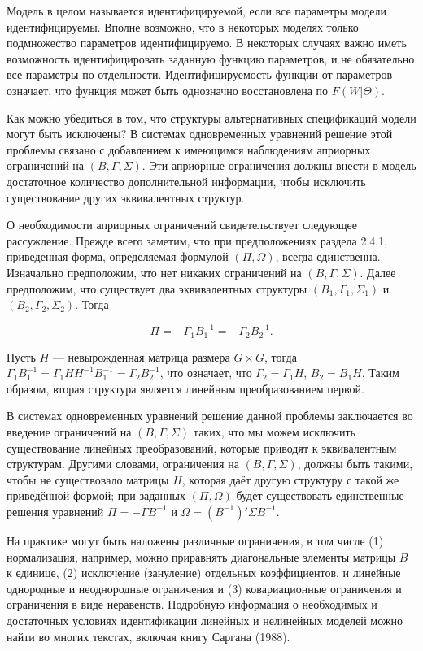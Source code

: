 Модель в целом называется идентифицируемой,  если все параметры модели идентифицируемы. Вполне возможно, что в некоторых моделях только подмножество параметров идентифицируемо. В некоторых случаях важно иметь возможность идентифицировать заданную функцию параметров, и не обязательно все  параметры по отдельности. Идентифицируемость функции от параметров означает, что функция может быть однозначно восстановлена по $F(W|\Theta)$.


Как можно убедиться в том, что структуры альтернативных спецификаций модели могут быть исключены? В системах одновременных уравнений решение этой проблемы связано с добавлением к имеющимся наблюдениям априорных ограничений на $(B,\Gamma,\Sigma)$. Эти априорные ограничения должны внести в модель достаточное количество дополнительной информации, чтобы исключить существование других эквивалентных структур.
	
	
О необходимости априорных ограничений свидетельствует следующее рассуждение. Прежде всего заметим, что при предположениях раздела 2.4.1, приведенная форма, определяемая формулой $(\Pi,\Omega)$, всегда единственна. Изначально предположим, что нет никаких ограничений на $(B,\Gamma,\Sigma)$. Далее предположим, что существует два эквивалентных структуры $(B_{1},\Gamma_{1},\Sigma_{1})$ и $(B_{2},\Gamma_{2},\Sigma_{2})$. Тогда
	
\begin{equation}
\Pi=-\Gamma_{1} B^{-1}_{1}=-\Gamma_{2} B^{-1}_{2}.
\end{equation}


Пусть $H$ --- невырожденная  матрица размера $G \times G$, тогда
$\Gamma_{1} B^{-1}_{1}=\Gamma_{1} H H^{-1} B^{-1}_{1}=\Gamma_{2} B^{-1}_{2}$, что означает, что $\Gamma_{2}=\Gamma_{1}H$, $B_{2}=B_{1}H$. Таким образом, вторая структура является линейным преобразованием первой.


В системах одновременных уравнений решение данной проблемы заключается во введение ограничений на $(B,\Gamma,\Sigma)$ таких, что мы можем исключить существование линейных преобразований, которые приводят к  эквивалентным структурам. Другими словами, ограничения на $(B,\Gamma,\Sigma)$, должны быть такими, чтобы не существовало матрицы $H$, которая даёт другую структуру с такой же приведённой формой; при заданных $(\Pi,\Omega)$ будет существовать единственные решения уравнений $\Pi=-\Gamma B^{-1}$ и $\Omega=(B^{-1})'\Sigma B^{-1}$.
	
	
На практике могут быть наложены различные ограничения, в том числе (1) нормализация, например, можно приравнять диагональные элементы матрицы $B$ к единице, (2) исключение (зануление) отдельных коэффициентов, и линейные однородные и неоднородные ограничения и (3) ковариационные ограничения и ограничения в виде неравенств.  Подробную информация о необходимых и достаточных условиях  идентификации  линейных и нелинейных моделей можно найти во многих текстах, включая книгу Саргана (1988).
	
